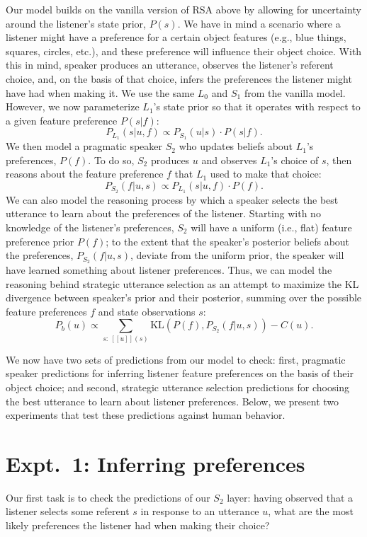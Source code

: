 \documentclass[10pt,a4paper]{article}
\begin{document}
Our model builds on the vanilla version of RSA above by allowing for uncertainty around the listener's state prior, $P(s)$. We have in mind a scenario where a listener might have a preference for a certain object features (e.g., blue things, squares, circles, etc.), and these preference will influence their object choice. With this in mind, speaker produces an utterance, observes the listener's referent choice, and, on the basis of that choice, infers the preferences the listener might have had when making it. We use the same $L_0$ and $S_1$ from the vanilla model. However, we now parameterize $L_1$'s state prior so that it operates with respect to a given feature preference $P(s|f)$:
$$P_{L_{1}}(s|u,f) \propto P_{S_{1}}(u|s) \cdot P(s|f).$$
We then model a pragmatic speaker $S_2$ who updates beliefs about $L_1$'s preferences, $P(f)$. To do so, $S_2$ produces $u$ and observes $L_1$'s choice of $s$, then reasons about the feature preference $f$ that $L_1$ used to make that choice:
$$P_{S_{2}}(f|u,s) \propto P_{L_{1}}(s|u,f) \cdot P(f).$$
We can also model the reasoning process by which a speaker selects the best utterance to learn about the preferences of the listener. Starting with no knowledge of the listener's preferences, $S_2$ will have a uniform (i.e., flat) feature preference prior $P(f)$; to the extent that the speaker's posterior beliefs about the preferences, $P_{S_{2}}(f|u,s)$, deviate from the uniform prior, the speaker will have learned something about listener preferences. Thus, we can model the reasoning behind strategic utterance selection as an attempt to maximize the KL divergence between speaker's prior and their posterior, summing over the possible feature preferences $f$ and state observations $s$:
$$P_{b}(u) \propto \sum_{s:\  [\![u]\!](s)}\textrm{KL}(P(f),P_{S_{2}}(f|u,s))-C(u).$$

We now have two sets of predictions from our model to check: first, pragmatic speaker predictions for inferring listener feature preferences on the basis of their object choice; and second, strategic utterance selection predictions for choosing the best utterance to learn about listener preferences. Below, we present two experiments that test these predictions against human behavior.


\section{Expt.~1: Inferring preferences}

Our first task is to check the predictions of our $S_2$ layer: having observed that a listener selects some referent $s$ in response to an utterance $u$, what are the most likely preferences the listener had when making their choice? 
\end{document}
